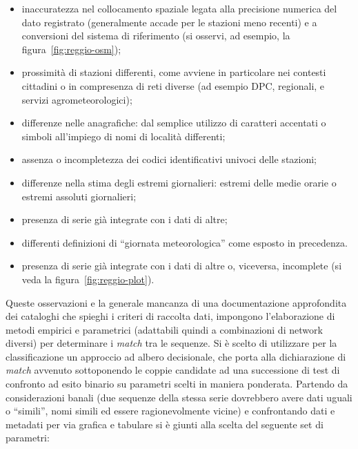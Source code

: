 \begin{itemize}
  \item inaccuratezza nel collocamento spaziale legata alla precisione numerica del dato registrato (generalmente accade per le stazioni meno recenti) e a conversioni del sistema di riferimento (si osservi, ad esempio, la figura~\ref{fig:reggio-osm});
  \item prossimità di stazioni differenti, come avviene in particolare nei contesti cittadini o in compresenza di reti diverse (ad esempio DPC, regionali, e servizi agrometeorologici);
  \item differenze nelle anagrafiche: dal semplice utilizzo di caratteri accentati o simboli all'impiego di nomi di località differenti;
  \item assenza o incompletezza dei codici identificativi univoci delle stazioni;
  \item differenze nella stima degli estremi giornalieri: estremi delle medie orarie o estremi assoluti giornalieri;
  \item presenza di serie già integrate con i dati di altre;
  \item differenti definizioni di ``giornata meteorologica'' come esposto in precedenza.
  \item presenza di serie già integrate con i dati di altre o, viceversa, incomplete (si veda la figura~\ref{fig:reggio-plot}).
\end{itemize}

Queste osservazioni e la generale mancanza di una documentazione approfondita dei cataloghi che spieghi i criteri di raccolta dati, impongono l'elaborazione di metodi empirici e parametrici (adattabili quindi a combinazioni di network diversi) per determinare i \emph{match} tra le sequenze. Si è scelto di utilizzare per la classificazione un approccio ad albero decisionale, che porta alla dichiarazione di \emph{match} avvenuto sottoponendo le coppie candidate ad una successione di test di confronto ad esito binario su parametri scelti in maniera ponderata. Partendo da considerazioni banali (due sequenze della stessa serie dovrebbero avere dati uguali o ``simili'', nomi simili ed essere ragionevolmente vicine) e confrontando dati e metadati per via grafica e tabulare si è giunti alla scelta del seguente set di parametri:

